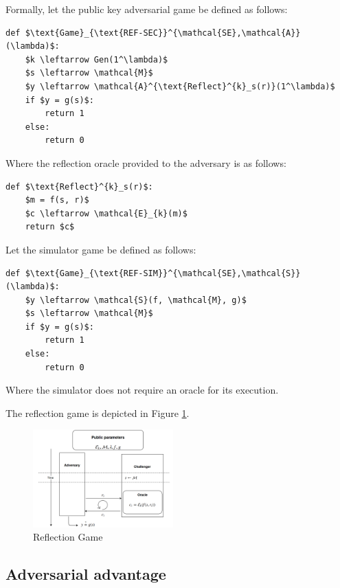 Formally, let the public key adversarial game be defined as follows:

\begin{lstlisting}[texcl,mathescape,basicstyle=\small]
def $\text{Game}_{\text{REF-SEC}}^{\mathcal{SE},\mathcal{A}}(\lambda)$:
    $k \leftarrow Gen(1^\lambda)$
    $s \leftarrow \mathcal{M}$
    $y \leftarrow \mathcal{A}^{\text{Reflect}^{k}_s(r)}(1^\lambda)$
    if $y = g(s)$:
        return 1
    else:
        return 0
\end{lstlisting}

Where the reflection oracle provided to the adversary is as follows:

\begin{lstlisting}[texcl,mathescape,basicstyle=\small]
def $\text{Reflect}^{k}_s(r)$:
    $m = f(s, r)$
    $c \leftarrow \mathcal{E}_{k}(m)$
    return $c$
\end{lstlisting}

Let the simulator game be defined as follows:

\begin{lstlisting}[texcl,mathescape,basicstyle=\small]
def $\text{Game}_{\text{REF-SIM}}^{\mathcal{SE},\mathcal{S}}(\lambda)$:
    $y \leftarrow \mathcal{S}(f, \mathcal{M}, g)$
    $s \leftarrow \mathcal{M}$
    if $y = g(s)$:
        return 1
    else:
        return 0
\end{lstlisting}

Where the simulator does not require an oracle for its execution.

The reflection game is depicted in Figure \ref{fig:refgame}.

    \begin{figure}[thpb]
        \centering
            \includegraphics[width=0.48\textwidth]{figures/reflection_game.png}
        \caption{Reflection Game}
        \label{fig:refgame}
    \end{figure}

\subsection{Adversarial advantage}\label{subsec:refsecadv}

